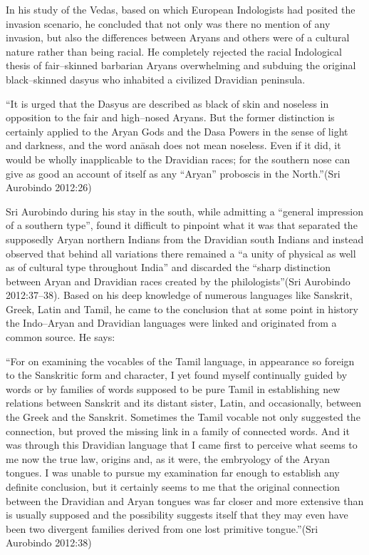 In his study of the Vedas, based on which European Indologists had posited the invasion scenario, he concluded that not only was there no mention of any invasion, but also the differences between Aryans and others were of a cultural nature rather than being racial. He completely rejected the racial Indological thesis of fair–skinned barbarian Aryans overwhelming and subduing the original black–skinned dasyus who inhabited a civilized Dravidian peninsula.

\begin{myquote}
“It is urged that the Dasyus are described as black of skin and noseless in opposition to the fair and high–nosed Aryans. But the former distinction is certainly applied to the Aryan Gods and the Dasa Powers in the sense of light and darkness, and the word anāsah does not mean noseless. Even if it did, it would be wholly inapplicable to the Dravidian races; for the southern nose can give as good an account of itself as any “Aryan” proboscis in the North.”(Sri Aurobindo 2012:26)
\end{myquote}

Sri Aurobindo during his stay in the south, while admitting a “general impression of a southern type”, found it difficult to pinpoint what it was that separated the supposedly Aryan northern Indians from the Dravidian south Indians and instead observed that behind all variations there remained a “a unity of physical as well as of cultural type throughout India” and discarded the “sharp distinction between Aryan and Dravidian races created by the philologists”(Sri Aurobindo 2012:37–38). Based on his deep knowledge of numerous languages like Sanskrit, Greek, Latin and Tamil, he came to the conclusion that at some point in history the Indo–Aryan and Dravidian languages were linked and originated from a common source. He says:

\begin{myquote}
“For on examining the vocables of the Tamil language, in appearance so foreign to the Sanskritic form and character, I yet found myself continually guided by words or by families of words supposed to be pure Tamil in establishing new relations between Sanskrit and its distant sister, Latin, and occasionally, between the Greek and the Sanskrit. Sometimes the Tamil vocable not only suggested the connection, but proved the missing link in a family of connected words. And it was through this Dravidian language that I came first to perceive what seems to me now the true law, origins and, as it were, the embryology of the Aryan tongues. I was unable to pursue my examination far enough to establish any definite conclusion, but it certainly seems to me that the original connection between the Dravidian and Aryan tongues was far closer and more extensive than is usually supposed and the possibility suggests itself that they may even have been two divergent families derived from one lost primitive tongue.”(Sri Aurobindo 2012:38)
\end{myquote}


